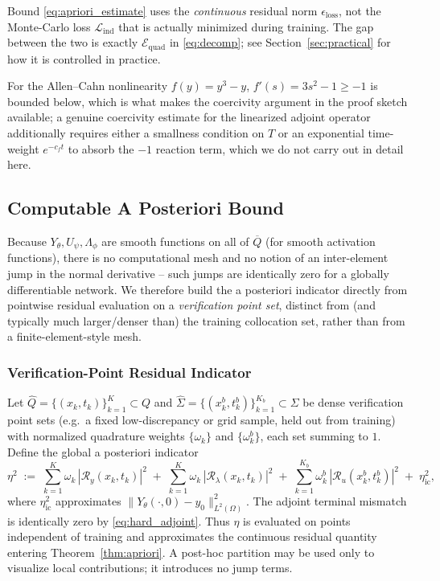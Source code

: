 \begin{remark}
\label{rem:continuous-vs-discrete}
Bound \eqref{eq:apriori_estimate} uses the \emph{continuous} residual norm $\epsilon_{\text{loss}}$, not the Monte-Carlo loss $\mathcal{L}_{\text{ind}}$ that is actually minimized during training. The gap between the two is exactly $\mathcal{E}_{\text{quad}}$ in \eqref{eq:decomp}; see Section~\ref{sec:practical} for how it is controlled in practice.
\end{remark}

\begin{remark}
For the Allen--Cahn nonlinearity $f(y)=y^3-y$, $f'(s)=3s^2-1\geq-1$ is bounded below, which is what makes the coercivity argument in the proof sketch available; a genuine coercivity estimate for the linearized adjoint operator additionally requires either a smallness condition on $T$ or an exponential time-weight $e^{-c_f t}$ to absorb the $-1$ reaction term, which we do not carry out in detail here.
\end{remark}

\subsection{Computable A Posteriori Bound}
\label{sec:aposteriori}

Because $Y_\theta, U_\psi, \Lambda_\phi$ are smooth functions on all of $\overline{Q}$ (for smooth activation functions), there is no computational mesh and no notion of an inter-element jump in the normal derivative -- such jumps are identically zero for a globally differentiable network. We therefore build the a posteriori indicator directly from pointwise residual evaluation on a \emph{verification point set}, distinct from (and typically much larger/denser than) the training collocation set, rather than from a finite-element-style mesh.

\subsubsection{Verification-Point Residual Indicator}
\label{sec:indicator}

Let $\widehat{Q} = \{(x_k,t_k)\}_{k=1}^{K}\subset Q$ and $\widehat{\Sigma} = \{(x_k^b,t_k^b)\}_{k=1}^{K_b}\subset \Sigma$ be dense verification point sets (e.g.\ a fixed low-discrepancy or grid sample, held out from training) with normalized quadrature weights $\{\omega_k\}$ and $\{\omega_k^b\}$, each set summing to $1$. Define the global a posteriori indicator
\begin{equation}
\label{eq:estimator_global}
\eta^2 \;:=\; \sum_{k=1}^{K} \omega_k\,|\mathcal{R}_y(x_k,t_k)|^2
\;+\; \sum_{k=1}^{K} \omega_k\,|\mathcal{R}_\lambda(x_k,t_k)|^2
\;+\; \sum_{k=1}^{K_b} \omega_k^b\,|\mathcal{R}_u(x_k^b,t_k^b)|^2
\;+\; \eta_{\text{ic}}^2,
\end{equation}
where $\eta_{\text{ic}}^2$ approximates $\|Y_\theta(\cdot,0)-y_0\|_{L^2(\Omega)}^2$. The adjoint terminal mismatch is identically zero by \eqref{eq:hard_adjoint}. Thus $\eta$ is evaluated on points independent of training and approximates the continuous residual quantity entering Theorem~\ref{thm:apriori}. A post-hoc partition may be used only to visualize local contributions; it introduces no jump terms.

